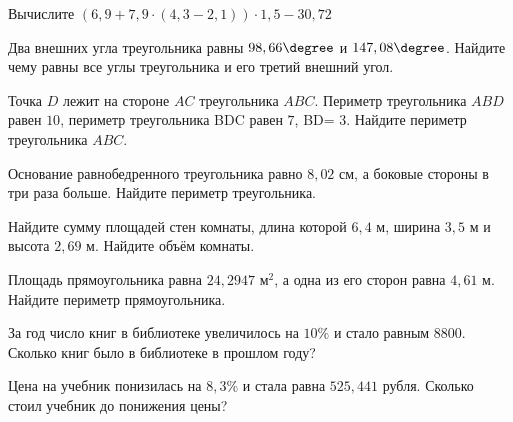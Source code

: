 \begin{exam}
	\begin{listofex}
		\item Вычислите  \( (6,9+7,9\cdot(4,3-2,1))\cdot1,5-30,72 \) 
		\item Два внешних угла треугольника равны \( 98,66\degree \) и \( 147,08\degree \). Найдите чему равны все углы треугольника и его третий внешний угол.
		\item Точка \( D \) лежит на стороне \( AC \) треугольника \( ABC \). Периметр треугольника \( ABD \) равен \( 10 \), периметр треугольника BDC равен \( 7 \), BD= \( 3 \). Найдите периметр треугольника \( ABC \).
		\item  Основание равнобедренного треугольника равно \( 8,02 \) см, а боковые стороны в три раза больше. Найдите периметр треугольника.
		\item Найдите сумму площадей стен комнаты, длина которой \( 6,4 \) м, ширина \( 3,5 \) м и высота \( 2,69 \) м. Найдите объём комнаты.
		\item Площадь прямоугольника равна \( 24,2947 \) м\( ^{2} \), а одна из его сторон равна \( 4,61 \) м. Найдите периметр прямоугольника.
		\item За год число книг в библиотеке увеличилось на \( 10\% \) и стало равным \( 8800 \). Сколько книг
		было в библиотеке в прошлом году?
		\item Цена на учебник понизилась на \( 8,3\% \) и стала равна \( 525,441  \) рубля. Сколько стоил учебник до понижения цены?
	\end{listofex}
\end{exam}


